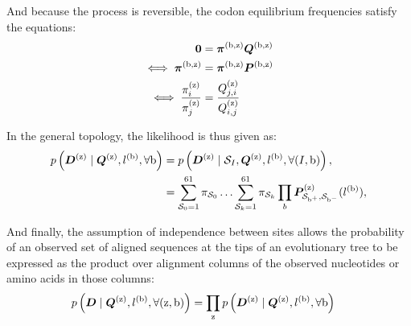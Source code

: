 And because the process is reversible, the codon equilibrium frequencies satisfy the equations:
\begin{align}
    \bm{0} & = \bm{\pi}^{(\text{b}, \text{z})} \bm{Q}^{(\text{b}, \text{z})} \\
    \iff \bm{\pi}^{(\text{b}, \text{z})} & = \bm{\pi}^{(\text{b}, \text{z})} \bm{P}^{(\text{b}, \text{z})} \\
    \iff \dfrac{\pi_{{i}}^{(\text{z})}}{\pi_{{j}}^{(\text{z})}} & = \dfrac{Q_{{j}, {i}}^{(\text{z})}}{Q_{{i}, {j}}^{(\text{z})}}
\end{align}

In the general topology, the likelihood is thus given as:
\begin{align}
    p\left(\bm{D}^{(\text{z})} \mid \bm{Q}^{(\text{z})}, l^{(\text{b})}, \forall \text{b} \right) & = p\left(\bm{D}^{(\text{z})} \mid \mathcal{S}_{I}, \bm{Q}^{(\text{z})}, l^{(\text{b})}, \forall (I, \text{b}) \right), \\
    & = \sum\limits_{\mathcal{S}_{0}=1}^{61} \pi_{\mathcal{S}_{0}} \hdots \sum\limits_{\mathcal{S}_{k}=1}^{61} \pi_{\mathcal{S}_{k}} \prod_{b} \bm{P}^{(\text{z})}_{\mathcal{S}_{\text{b}^{+}}, \mathcal{S}_{\text{b}^{-}}}(l^{(\text{b})}), \label{eq:likelihood-site}
\end{align}

And finally, the assumption of independence between sites allows the probability of an observed set of aligned sequences at the tips of an evolutionary tree to be expressed as the product over alignment columns of the observed nucleotides or amino acids in those columns:
\begin{align}
    p\left(\bm{D} \mid \bm{Q}^{(\text{z})}, l^{(\text{b})}, \forall (\text{z}, \text{b}) \right) & = \prod_{\text{z}} p\left(\bm{D}^{(\text{z})} \mid \bm{Q}^{(\text{z})}, l^{(\text{b})}, \forall \text{b} \right) \label{eq:likelihood}
\end{align}

